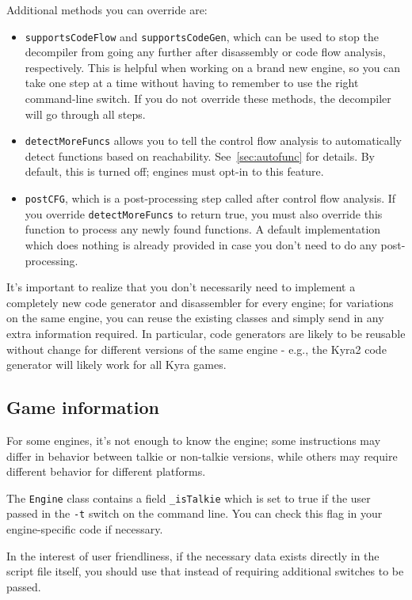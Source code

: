 Additional methods you can override are:
\begin{itemize}
\item \verb+supportsCodeFlow+ and \verb+supportsCodeGen+, which can be used to stop the decompiler from going any further after disassembly or code flow analysis, respectively. This is helpful when working on a brand new engine, so you can take one step at a time without having to remember to use the right command-line switch. If you do not override these methods, the decompiler will go through all steps.
\item \verb+detectMoreFuncs+ allows you to tell the control flow analysis to automatically detect functions based on reachability. See~\vref{sec:autofunc} for details. By default, this is turned off; engines must opt-in to this feature.
\item \verb+postCFG+, which is a post-processing step called after control flow analysis. If you override \verb+detectMoreFuncs+ to return true, you must also override this function to process any newly found functions. A default implementation which does nothing is already provided in case you don't need to do any post-processing.
\end{itemize}

It's important to realize that you don't necessarily need to implement a completely new code generator and disassembler for every engine; for variations on the same engine, you can reuse the existing classes and simply send in any extra information required. In particular, code generators are likely to be reusable without change for different versions of the same engine - e.g., the Kyra2 code generator will likely work for all Kyra games.

\subsection{Game information}
For some engines, it's not enough to know the engine; some instructions may differ in behavior between talkie or non-talkie versions, while others may require different behavior for different platforms.

The \verb+Engine+ class contains a field \verb+_isTalkie+ which is set to true if the user passed in the \verb+-t+ switch on the command line. You can check this flag in your engine-specific code if necessary.

In the interest of user friendliness, if the necessary data exists directly in the script file itself, you should use that instead of requiring additional switches to be passed.

